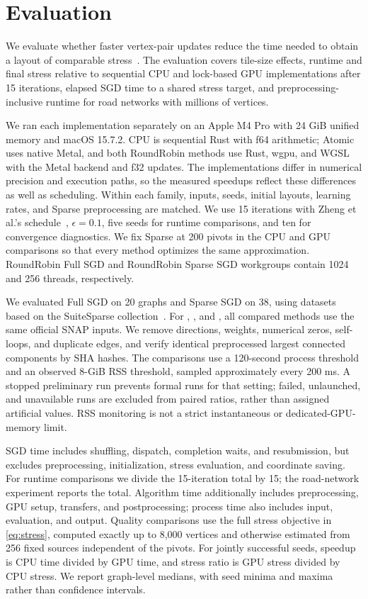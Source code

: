 \section{Evaluation}
\label{sec:evaluation}
We evaluate whether faster vertex-pair updates reduce the time needed to obtain a layout of comparable stress~\cite{ref46}. The evaluation covers tile-size effects, runtime and final stress relative to sequential CPU and lock-based GPU implementations after 15 iterations, elapsed SGD time to a shared stress target, and preprocessing-inclusive runtime for road networks with millions of vertices.

We ran each implementation separately on an Apple M4 Pro with 24 GiB unified memory and macOS 15.7.2.
CPU is sequential Rust with f64 arithmetic; Atomic uses native Metal, and both RoundRobin methods use Rust, wgpu, and WGSL~\cite{ref31} with the Metal backend and f32 updates.
The implementations differ in numerical precision and execution paths, so the measured speedups reflect these differences as well as scheduling.
Within each family, inputs, seeds, initial layouts, learning rates, and Sparse preprocessing are matched.
We use 15 iterations with Zheng et al.'s schedule~\cite{ref28}, $\epsilon=0.1$, five seeds for runtime comparisons, and ten for convergence diagnostics.
We fix Sparse at 200 pivots in the CPU and GPU comparisons so that every method optimizes the same approximation. RoundRobin Full SGD and RoundRobin Sparse SGD workgroups contain 1024 and 256 threads, respectively.

We evaluated Full SGD on 20 graphs and Sparse SGD on 38, using datasets based on the SuiteSparse collection~\cite{ref6}.
For , , and , all compared methods use the same official SNAP inputs.
We remove directions, weights, numerical zeros, self-loops, and duplicate edges, and verify identical preprocessed largest connected components by SHA hashes.
The comparisons use a 120-second process threshold and an observed 8-GiB RSS threshold, sampled approximately every 200 ms.
A stopped preliminary run prevents formal runs for that setting; failed, unlaunched, and unavailable runs are excluded from paired ratios, rather than assigned artificial values.
RSS monitoring is not a strict instantaneous or dedicated-GPU-memory limit.

SGD time includes shuffling, dispatch, completion waits, and resubmission, but excludes preprocessing, initialization, stress evaluation, and coordinate saving.
For runtime comparisons we divide the 15-iteration total by 15; the road-network experiment reports the total.
Algorithm time additionally includes preprocessing, GPU setup, transfers, and postprocessing; process time also includes input, evaluation, and output.
Quality comparisons use the full stress objective in \eqref{eq:stress}, computed exactly up to 8,000 vertices and otherwise estimated from 256 fixed sources independent of the pivots.
For jointly successful seeds, speedup is CPU time divided by GPU time, and stress ratio is GPU stress divided by CPU stress.
We report graph-level medians, with seed minima and maxima rather than confidence intervals.

